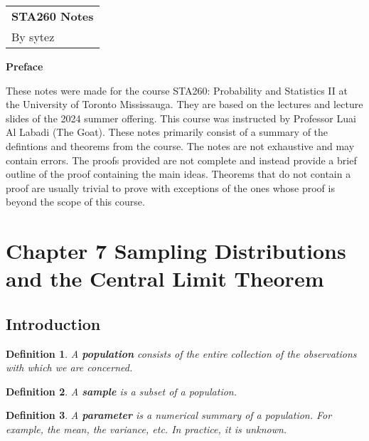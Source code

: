 \documentclass[a4paper,12pt]{article}
\theoremstyle{nonitalic}
\newtheorem{definition}{Definition}[subsection]
\begin{document}
    \thispagestyle{empty}

    \begin{tabular}{p{15.5cm}}  
        {\Large \bf STA260 Notes}\\
        By sytez\\
        \hline
    \end{tabular}

    \begin{center}
        {\Large \bf Preface}
    \end{center}

    \quad These notes were made for the course STA260: Probability and Statistics II at the University of Toronto Mississauga. They are based on the lectures and lecture slides of the 2024 summer offering. This course was instructed by Professor Luai Al Labadi (The Goat). These notes primarily consist of a summary of the defintions and theorems from the course. The notes are not exhaustive and may contain errors. The proofs provided are not complete and instead provide a brief outline of the proof containing the main ideas. Theorems that do not contain a proof are usually trivial to prove with exceptions of the ones whose proof is beyond the scope of this course.

    \newpage
    
    \tableofcontents
    \newpage

    \setcounter{section}{6}

    \section{Chapter 7 \textemdash{} Sampling Distributions and the Central Limit Theorem}

    \subsection{Introduction}

    \begin{definition}
        A \textbf{population} consists of the entire collection of the observations with which we are concerned.
    \end{definition}

    \begin{definition}
        A \textbf{sample} is a subset of a population.
    \end{definition}

    \begin{definition}
        A \textbf{parameter} is a numerical summary of a population. For example, the mean, the variance, etc. In practice, it is unknown.
    \end{definition}
\end{document}

